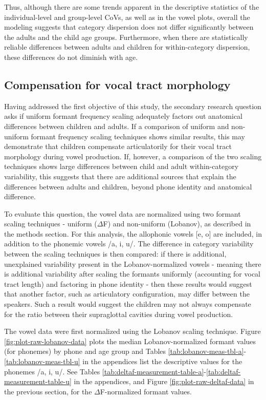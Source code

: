 \documentclass[
]{article}
\begin{document}
Thus, although there are some trends apparent in the descriptive statistics of the individual-level and group-level CoVs, as well as in the vowel plots, overall the modeling suggests that category dispersion does not differ significantly between the adults and the child age groups. Furthermore, when there are statistically reliable differences between adults and children for within-category dispersion, these differences do not diminish with age.

\hypertarget{compensation-for-vocal-tract-morphology}{%
\subsection{Compensation for vocal tract morphology}\label{compensation-for-vocal-tract-morphology}}

Having addressed the first objective of this study, the secondary research question asks if uniform formant frequency scaling adequately factors out anatomical differences between children and adults. If a comparison of uniform and non-uniform formant frequency scaling techniques shows similar results, this may demonstrate that children compensate articulatorily for their vocal tract morphology during vowel production. If, however, a comparison of the two scaling techniques shows large differences between child and adult within-category variability, this suggests that there are additional sources that explain the differences between adults and children, beyond phone identity and anatomical difference.

To evaluate this question, the vowel data are normalized using two formant scaling techniques - uniform (\(\Delta\)F) and non-uniform (Lobanov), as described in the methods section. For this analysis, the allophonic vowels {[}e, o{]} are included, in addition to the phonemic vowels /a, i, u/. The difference in category variability between the scaling techniques is then compared: if there is additional, unexplained variability present in the Lobanov-normalized vowels - meaning there is additional variability after scaling the formants uniformly (accounting for vocal tract length) and factoring in phone identity - then these results would suggest that another factor, such as articulatory configuration, may differ between the speakers. Such a result would suggest the children may not always compensate for the ratio between their supraglottal cavities during vowel production.

The vowel data were first normalized using the Lobanov scaling technique. Figure \ref{fig:plot-raw-lobanov-data} plots the median Lobanov-normalized formant values (for phonemes) by phone and age group and Tables \ref{tab:lobanov-meas-tbl-a}-\ref{tab:lobanov-meas-tbl-u} in the appendices list the descriptive values for the phonemes /a, i, u/. See Tables \ref{tab:deltaf-measurement-table-a}-\ref{tab:deltaf-measurement-table-u} in the appendices, and Figure \ref{fig:plot-raw-deltaf-data} in the previous section, for the \(\Delta\)F-normalized formant values.
\end{document}
